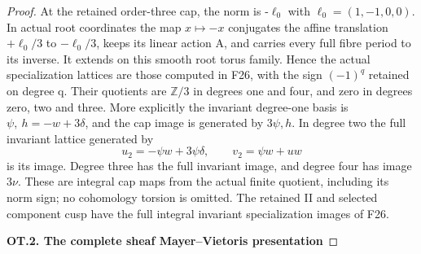 \begin{proof}
At the retained order-three cap, the norm is -\(\ell_0\) with
\(\ell_0=(1,-1,0,0)\). In actual root coordinates the map \(x\mapsto-x\) conjugates
the affine translation \(+\ell_0/3\) to \(-\ell_0/3\), keeps its linear action A,
and carries every full fibre period to its inverse. It extends on this
smooth root torus family. Hence the actual specialization lattices are
those computed in F26, with the sign \((-1)^q\) retained on degree q. Their
quotients are \(\mathbb Z/3\) in degrees one and four, and zero in degrees zero,
two and three. More explicitly the invariant degree-one basis is
\(\psi,\ h=-w+3\delta\), and the cap image is generated by \(3\psi,h\). In degree two
the full invariant lattice generated by
\[
                u_2=-\psi w+3\psi\delta,
                 \qquad v_2=\psi w+uw
\]
is its image. Degree three has the full invariant image, and degree four
has image \(3\nu\). These are integral cap maps from the actual finite
quotient, including its norm sign; no cohomology torsion is omitted.
The retained II and selected component cusp have the full integral
invariant specialization images of F26.

\par

\medskip\noindent\textbf{OT.2. The complete sheaf Mayer--Vietoris presentation}

\par\nobreak


\end{proof}
